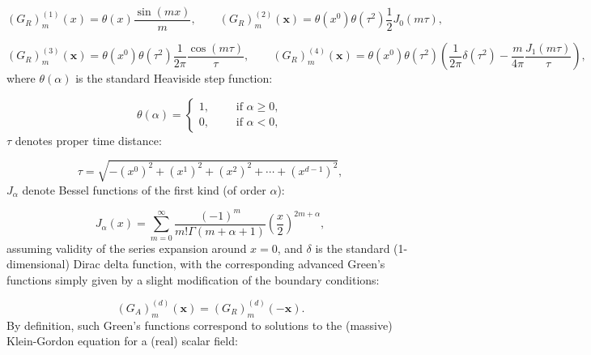 \documentclass{article}
\begin{document}
\begin{equation}
\left( G_R \right)_{m}^{\left( 1 \right)} \left( x \right) = \theta \left( x \right) \frac{\sin \left( m x \right)}{m}, \qquad \left( G_R \right)_{m}^{\left( 2 \right)} \left( \mathbf{x} \right) = \theta \left( x^0 \right) \theta \left( \tau^2 \right) \frac{1}{2} J_0 \left( m \tau \right),
\end{equation}

\begin{equation}
\left( G_R \right)_{m}^{\left( 3 \right)} \left( \mathbf{x} \right) = \theta \left( x^0 \right) \theta \left( \tau^2 \right) \frac{1}{2 \pi} \frac{\cos \left( m \tau \right)}{\tau}, \qquad \left(G_R \right)_{m}^{\left( 4 \right)} \left( \mathbf{x} \right) = \theta \left( x^0 \right) \theta \left( \tau^2 \right) \left( \frac{1}{2 \pi} \delta \left( \tau^2 \right) - \frac{m}{4 \pi} \frac{J_1 \left( m \tau \right)}{\tau} \right),
\end{equation}
where ${\theta \left( \alpha \right)}$ is the standard Heaviside step function:

\begin{equation}
\theta \left( \alpha \right) = \begin{cases}
1, \qquad \text{ if } \alpha \geq 0,\\
0, \qquad \text{ if } \alpha < 0,
\end{cases}
\end{equation}
${\tau}$ denotes proper time distance:

\begin{equation}
\tau = \sqrt{- \left( x^0 \right)^2 + \left( x^1 \right)^2 + \left( x^2 \right)^2 + \cdots + \left( x^{d - 1} \right)^2},
\end{equation}
${J_{\alpha}}$ denote Bessel functions of the first kind (of order ${\alpha}$):

\begin{equation}
J_{\alpha} \left( x \right) = \sum_{m = 0}^{\infty} \frac{\left( -1 \right)^m}{m ! \Gamma \left( m + \alpha + 1 \right)} \left( \frac{x}{2} \right)^{2 m + \alpha},
\end{equation}
assuming validity of the series expansion around ${x = 0}$, and ${\delta}$ is the standard (1-dimensional) Dirac delta function, with the corresponding advanced Green's functions simply given by a slight modification of the boundary conditions:

\begin{equation}
\left( G_A \right)_{m}^{\left( d \right)} \left( \mathbf{x} \right) = \left( G_R \right)_{m}^{\left( d \right)} \left( - \mathbf{x} \right).
\end{equation}
By definition, such Green's functions correspond to solutions to the (massive) Klein-Gordon equation for a (real) scalar field:
\end{document}
